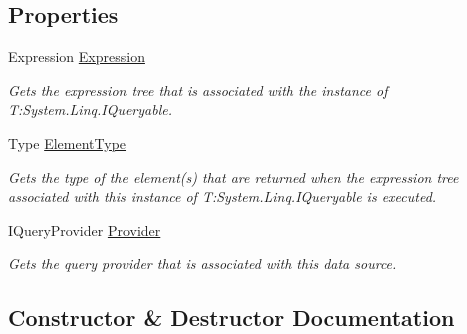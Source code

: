 \subsection*{Properties}
\begin{DoxyCompactItemize}
\item 
Expression \hyperlink{classCqrs_1_1Sql_1_1DataStores_1_1SqlDataStore_a821c821912482862e0b6143a3125e2e1}{Expression}
\begin{DoxyCompactList}\small\item\em Gets the expression tree that is associated with the instance of T\+:\+System.\+Linq.\+I\+Queryable. \end{DoxyCompactList}\item 
Type \hyperlink{classCqrs_1_1Sql_1_1DataStores_1_1SqlDataStore_a60de9af52248c2d71e2bb010e51b5c06}{Element\+Type}
\begin{DoxyCompactList}\small\item\em Gets the type of the element(s) that are returned when the expression tree associated with this instance of T\+:\+System.\+Linq.\+I\+Queryable is executed. \end{DoxyCompactList}\item 
I\+Query\+Provider \hyperlink{classCqrs_1_1Sql_1_1DataStores_1_1SqlDataStore_af732efd5901590c769e2ace2a4f4f913}{Provider}
\begin{DoxyCompactList}\small\item\em Gets the query provider that is associated with this data source. \end{DoxyCompactList}\end{DoxyCompactItemize}


\subsection{Constructor \& Destructor Documentation}
\mbox{\label{classCqrs_1_1Sql_1_1DataStores_1_1SqlDataStore_a3ddc911126acbde0353e7773ddfa8acc}} 
